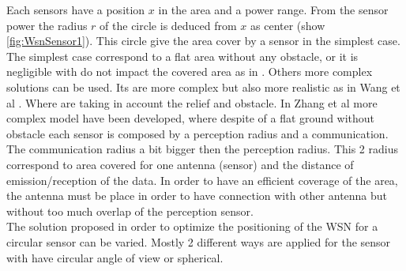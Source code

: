 Each sensors have a position $x$ in the area and a power range. From the sensor power  the radius $r$ of the circle is deduced from $x$ as center (show \ref{fig:WsnSensor1}). This circle give the area cover by a sensor in the simplest case. 
The simplest case correspond to a flat area without any obstacle, or it is negligible with do not impact the covered area as in \cite{200*kulkarni2011,174*zhang2016}.  
Others more complex solutions can be used. Its are more complex but also more realistic as in Wang et al \cite{59*wang2008}. Where are taking in account the relief and obstacle. 
In Zhang et al \cite{174*zhang2016} more complex model have been developed, where despite of a flat ground without obstacle each sensor is composed by a perception radius and a communication. The communication radius a bit bigger then the perception radius. This 2 radius correspond to area covered for one antenna (sensor) and the distance of emission/reception of the data.  In order to have an efficient coverage of the area, the antenna must be place in order to have connection with other antenna but without too much overlap of the perception sensor.\\

The solution proposed in order to optimize the positioning of the WSN for a circular sensor can be varied. Mostly 2 different ways are applied for the sensor with have circular angle of view or spherical.\\

